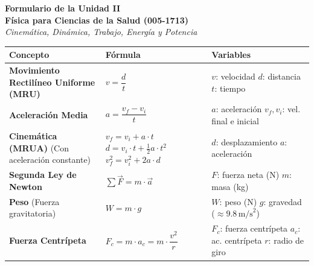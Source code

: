\documentclass[12pt,letterpaper]{article}
\begin{document}
\begin{center}
    \textbf{\Large Formulario de la Unidad II}\\
    \vspace{0.2cm}
    \textbf{Física para Ciencias de la Salud (005-1713)}\\
    \vspace{0.2cm}
    \textit{Cinemática, Dinámica, Trabajo, Energía y Potencia}
\end{center}

\vspace{0.5cm}

\begin{table}[h!]
    \centering
    \renewcommand{\arraystretch}{2} %
    \begin{tabular}{|>{\raggedright\arraybackslash}p{4cm}|>{\centering\arraybackslash}p{5.5cm}|>{\raggedright\arraybackslash}p{5cm}|}
        \hline
        \textbf{Concepto} & \textbf{Fórmula} & \textbf{Variables} \\
        \hline
        \textbf{Movimiento Rectilíneo Uniforme (MRU)} & $v = \dfrac{d}{t}$ & $v$: velocidad \newline $d$: distancia \newline $t$: tiempo \\
        \hline
        \textbf{Aceleración Media} & $a = \dfrac{v_f - v_i}{t}$ & $a$: aceleración \newline $v_f, v_i$: vel. final e inicial \\
        \hline
        \textbf{Cinemática (MRUA)} \newline (Con aceleración constante) & $v_f = v_i + a \cdot t$ \newline $d = v_i \cdot t + \frac{1}{2}a \cdot t^2$ \newline $v_f^2 = v_i^2 + 2a \cdot d$ & $d$: desplazamiento \newline $a$: aceleración \\
        \hline
        \textbf{Segunda Ley de Newton} & $\sum \vec{F} = m \cdot \vec{a}$ & $F$: fuerza neta (N) \newline $m$: masa (kg) \\
        \hline
        \textbf{Peso} \newline (Fuerza gravitatoria) & $W = m \cdot g$ & $W$: peso (N) \newline $g$: gravedad ($\approx 9.8 \, \text{m/s}^2$) \\
        \hline
        \textbf{Fuerza Centrípeta} & $F_c = m \cdot a_c = m \cdot \dfrac{v^2}{r}$ & $F_c$: fuerza centrípeta \newline $a_c$: ac. centrípeta \newline $r$: radio de giro \\

\end{tabular}
\end{table}
\end{document}
